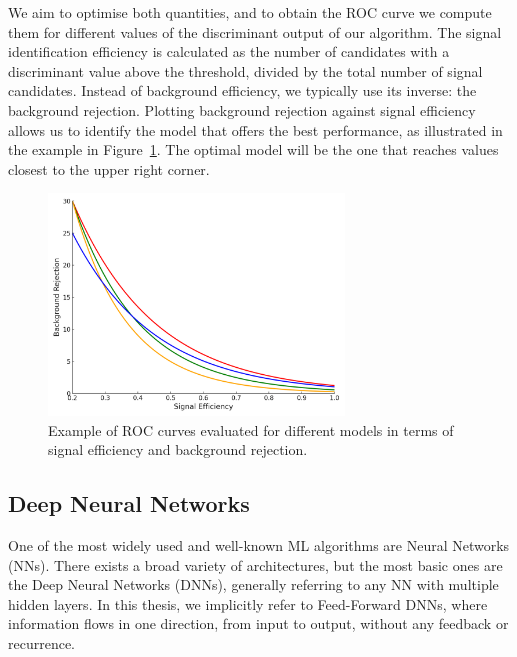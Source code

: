 We aim to optimise both quantities, and to obtain the ROC curve we compute them for different values of the discriminant output of our algorithm. The signal identification efficiency is calculated as the number of candidates with a discriminant value above the threshold, divided by the total number of signal candidates. Instead of background efficiency, we typically use its inverse: the background rejection. Plotting background rejection against signal efficiency allows us to identify the model that offers the best performance, as illustrated in the example in Figure~\ref{fig:roc_curves}. The optimal model will be the one that reaches values closest to the upper right corner.

\begin{figure}[htbp]
    \centering
    \includegraphics[width=0.7\textwidth]{images/roc_curves_clean.png}
    \caption{Example of ROC curves evaluated for different models in terms of signal efficiency and background rejection.}
    \label{fig:roc_curves}
  \end{figure}

\subsection{Deep Neural Networks}
\label{subsec:dnn_general}

One of the most widely used and well-known ML algorithms are Neural Networks (NNs). There exists a broad variety of architectures, but the most basic ones are the Deep Neural Networks (DNNs), generally referring to any NN with multiple hidden layers. In this thesis, we implicitly refer to Feed-Forward DNNs, where information flows in one direction, from input to output, without any feedback or recurrence.

